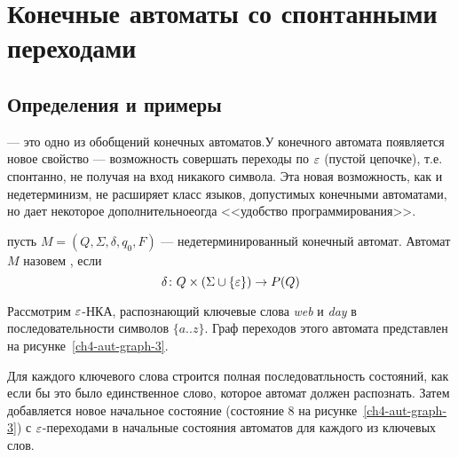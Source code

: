 \chapter{Конечные автоматы со спонтанными переходами}
\label{Chapter4}
\section{Определения и примеры}
\label{Chapter4Defines}
 --- это одно из обобщений конечных автоматов.У конечного автомата появляется новое свойство --- возможность совершать переходы по $\varepsilon$ (пустой цепочке), т.е. спонтанно, не получая на вход никакого символа. Эта новая возможность, как и недетерминизм, не расширяет класс языков, допустимых конечными автоматами, но дает некоторое дополнительноеогда  <<удобство программирования>>.

пусть $M = (Q,\Sigma, \delta, q_0, F)$ --- недетерминированный конечный автомат. Автомат $M$
назовем , если
\[
    \delta \colon Q \times (\Sigma \cup \{ \varepsilon \} ) \to P(Q)
\]


\begin{myexample}
Рассмотрим $\varepsilon$-НКА, распознающий ключевые слова \emph{web} и \emph{day} в последовательности символов $\{ a..z \}$. Граф переходов этого автомата представлен на рисунке~\ref{ch4-aut-graph-3}.

Для каждого ключевого слова строится полная последоватльность состояний, как если бы это было единственное слово, которое автомат должен распознать. Затем добавляется новое начальное состояние (состояние 8 на рисунке~\ref{ch4-aut-graph-3}) с $\varepsilon$-переходами в начальные состояния автоматов для каждого из ключевых слов.
\end{myexample}

